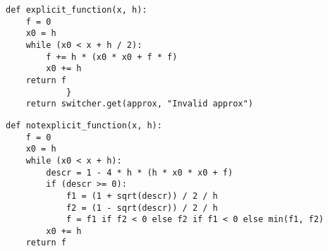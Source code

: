 \documentclass[a4paper,14pt]{article} %
\begin{document}
\begin{lstlisting}[caption=Метод Эйлера(явный)]
def explicit_function(x, h):
    f = 0
    x0 = h
    while (x0 < x + h / 2):
        f += h * (x0 * x0 + f * f)
        x0 += h
    return f
            }
    return switcher.get(approx, "Invalid approx")
\end{lstlisting}

\begin{lstlisting}[caption=Метод Эйлера(неявный)]
def notexplicit_function(x, h):
    f = 0
    x0 = h
    while (x0 < x + h):
        descr = 1 - 4 * h * (h * x0 * x0 + f)
        if (descr >= 0):
            f1 = (1 + sqrt(descr)) / 2 / h
            f2 = (1 - sqrt(descr)) / 2 / h
            f = f1 if f2 < 0 else f2 if f1 < 0 else min(f1, f2)
        x0 += h
    return f
\end{lstlisting}
\end{document}

